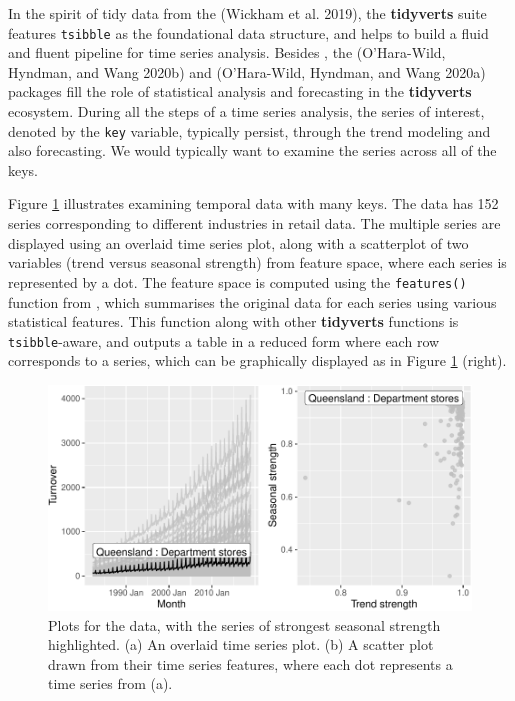 In the spirit of tidy data from the  (Wickham et al. 2019), the \textbf{tidyverts} suite features \texttt{tsibble} as the foundational data structure, and helps to build a fluid and fluent pipeline for time series analysis. Besides , the  (O'Hara-Wild, Hyndman, and Wang 2020b) and  (O'Hara-Wild, Hyndman, and Wang 2020a) packages fill the role of statistical analysis and forecasting in the \textbf{tidyverts} ecosystem. During all the steps of a time series analysis, the series of interest, denoted by the \texttt{key} variable, typically persist, through the trend modeling and also forecasting. We would typically want to examine the series across all of the keys.

Figure \ref{fig:highlight-retail} illustrates examining temporal data with many keys. The data has 152 series corresponding to different industries in retail data. The multiple series are displayed using an overlaid time series plot, along with a scatterplot of two variables (trend versus seasonal strength) from feature space, where each series is represented by a dot. The feature space is computed using the \texttt{features()} function from , which summarises the original data for each series using various statistical features. This function along with other \textbf{tidyverts} functions is \texttt{tsibble}-aware, and outputs a table in a reduced form where each row corresponds to a series, which can be graphically displayed as in Figure \ref{fig:highlight-retail} (right).

\begin{figure}

{\centering \includegraphics[width=\textwidth]{figure/highlight-retail-1} 

}

\caption{Plots for the  data, with the series of strongest seasonal strength highlighted. (a) An overlaid time series plot. (b) A scatter plot drawn from their time series features, where each dot represents a time series from (a).}\label{fig:highlight-retail}
\end{figure}

